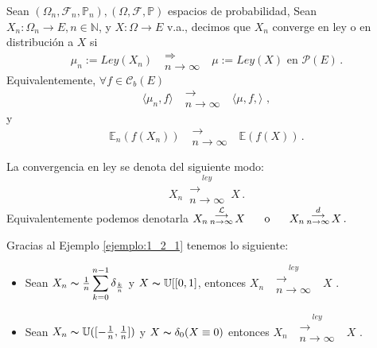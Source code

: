\begin{definition}
Sean $(\Omega_n,\mathcal{F}_n,\mathbb{P}_n), (\Omega,\mathcal{F},\mathbb{P})$ espacios de probabilidad, Sean $X_n:\Omega_n \longrightarrow E, n\in\mathbb{N}$, y $X:\Omega \longrightarrow E$ v.a., decimos que $X_n$ converge en ley o en distribución a $X$ si 
$$\mu_n:=Ley(X_n) \mbox{ }\substack{\Longrightarrow \\n \to \infty}\mbox{ } \mu:=Ley(X)\mbox{ en }\mathcal{P}(E) \, .$$
Equivalentemente, $\forall f \in \mathcal{C}_b(E)$ $$ \langle \mu_n,f \rangle \mbox{ }\substack{\longrightarrow \\ n\to\infty}\mbox{ } \langle \mu,f,\rangle\, \, ,$$
y 
$$ \mathbb{E}_n(f(X_n)) \mbox{ }\substack{\longrightarrow \\ n\to\infty}\mbox{ } \mathbb{E}(f(X))\, .$$
\end{definition}
\begin{notation}
La convergencia en ley se denota del siguiente modo:
$$X_n \,\overset{ley}{\substack{\longrightarrow \\n \to \infty}}\,X \, .$$
Equivalentemente podemos denotarla \espacio
$ X_n \,\overset{\mathcal{L}}{\substack{\longrightarrow \\n \to \infty}}\,X \hspace{.5cm}\mbox{ o }\hspace{.5cm} X_n\,\overset{d}{\substack{\longrightarrow \\n \to \infty}}\,X \, .$
\end{notation}

\begin{example}
Gracias al Ejemplo \ref{ejemplo:1_2_1} tenemos lo siguiente:
\begin{itemize}
    \item Sean $X_n \thicksim \frac{1}{n}\displaystyle\sum_{k=0}^{n-1}\delta_{\frac{k}{n}}$ y $X \thicksim \mathbb{U}[[0,1]$, entonces $X_n \mbox{ }\overset{ley}{\substack{\longrightarrow \\n \to \infty}}\mbox{ }X$ .
    \item Sean $X_n \thicksim \mathbb{U}([-\frac{1}{n},\frac{1}{n}])$ y $X \thicksim \delta_0 (X \equiv 0)$ entonces $X_n\mbox{ }\overset{ley}{\substack{\longrightarrow \\n \to \infty}}\mbox{ }X$ .
\end{itemize}
\end{example}

